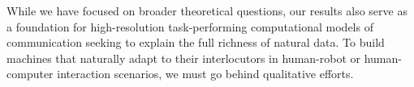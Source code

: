 While we have focused on broader theoretical questions, our results also serve as a foundation for high-resolution task-performing computational models of communication seeking to explain the full richness of natural data. 
To build machines that naturally adapt to their interlocutors in human-robot or human-computer interaction scenarios, we must go behind qualitative efforts.
